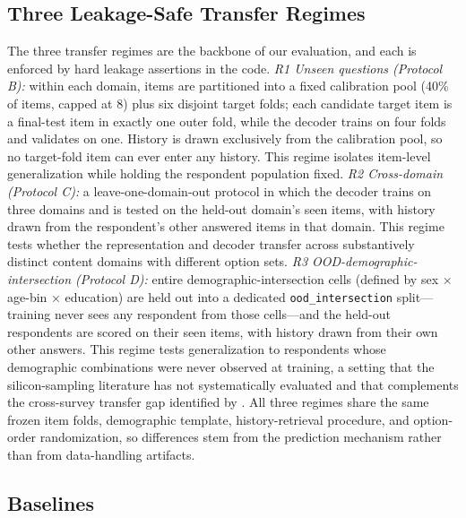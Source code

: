 \subsection{Three Leakage-Safe Transfer Regimes}
\label{sec:regimes}

The three transfer regimes are the backbone of our evaluation, and each is enforced by hard leakage assertions in the code. \emph{R1 Unseen questions (Protocol B):} within each domain, items are partitioned into a fixed calibration pool (40\% of items, capped at 8) plus six disjoint target folds; each candidate target item is a final-test item in exactly one outer fold, while the decoder trains on four folds and validates on one. History is drawn exclusively from the calibration pool, so no target-fold item can ever enter any history. This regime isolates item-level generalization while holding the respondent population fixed. \emph{R2 Cross-domain (Protocol C):} a leave-one-domain-out protocol in which the decoder trains on three domains and is tested on the held-out domain's seen items, with history drawn from the respondent's other answered items in that domain. This regime tests whether the representation and decoder transfer across substantively distinct content domains with different option sets. \emph{R3 OOD-demographic-intersection (Protocol D):} entire demographic-intersection cells (defined by sex $\times$ age-bin $\times$ education) are held out into a dedicated \texttt{ood\_intersection} split---training never sees any respondent from those cells---and the held-out respondents are scored on their seen items, with history drawn from their own other answers. This regime tests generalization to respondents whose demographic combinations were never observed at training, a setting that the silicon-sampling literature has not systematically evaluated and that complements the cross-survey transfer gap identified by \citet{ku2026silicon}. All three regimes share the same frozen item folds, demographic template, history-retrieval procedure, and option-order randomization, so differences stem from the prediction mechanism rather than from data-handling artifacts.

\subsection{Baselines}
\label{sec:baselines}

